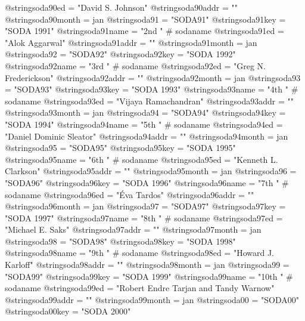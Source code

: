 @string{soda90ed =              "David S. Johnson"}
@string{soda90addr =            ""}
@string{soda90month =           jan}
@string{soda91 =                "SODA91"}
@string{soda91key =             "SODA 1991"}
@string{soda91name =            "2nd " # sodaname}
@string{soda91ed =              "Alok Aggarwal"}
@string{soda91addr =            ""}
@string{soda91month =           jan}
@string{soda92 =                "SODA92"}
@string{soda92key =             "SODA 1992"}
@string{soda92name =            "3rd " # sodaname}
@string{soda92ed =              "Greg N. Frederickson"}
@string{soda92addr =            ""}
@string{soda92month =           jan}
@string{soda93 =                "SODA93"}
@string{soda93key =             "SODA 1993"}
@string{soda93name =            "4th " # sodaname}
@string{soda93ed =              "Vijaya Ramachandran"}
@string{soda93addr =            ""}
@string{soda93month =           jan}
@string{soda94 =                "SODA94"}
@string{soda94key =             "SODA 1994"}
@string{soda94name =            "5th " # sodaname}
@string{soda94ed =              "Daniel Dominic Sleator"}
@string{soda94addr =            ""}
@string{soda94month =           jan}
@string{soda95 =                "SODA95"}
@string{soda95key =             "SODA 1995"}
@string{soda95name =            "6th " # sodaname}
@string{soda95ed =              "Kenneth L. Clarkson"}
@string{soda95addr =            ""}
@string{soda95month =           jan}
@string{soda96 =                "SODA96"}
@string{soda96key =             "SODA 1996"}
@string{soda96name =            "7th " # sodaname}
@string{soda96ed =              "{\'E}va Tardos"}
@string{soda96addr =            ""}
@string{soda96month =           jan}
@string{soda97 =                "SODA97"}
@string{soda97key =             "SODA 1997"}
@string{soda97name =            "8th " # sodaname}
@string{soda97ed =              "Michael E. Saks"}
@string{soda97addr =            ""}
@string{soda97month =           jan}
@string{soda98 =                "SODA98"}
@string{soda98key =             "SODA 1998"}
@string{soda98name =            "9th " # sodaname}
@string{soda98ed =              "Howard J. Karloff"}
@string{soda98addr =            ""}
@string{soda98month =           jan}
@string{soda99 =                "SODA99"}
@string{soda99key =             "SODA 1999"}
@string{soda99name =            "10th " # sodaname}
@string{soda99ed =              "Robert Endre Tarjan and Tandy Warnow"}
@string{soda99addr =            ""}
@string{soda99month =           jan}
@string{soda00 =                "SODA00"}
@string{soda00key =             "SODA 2000"}
